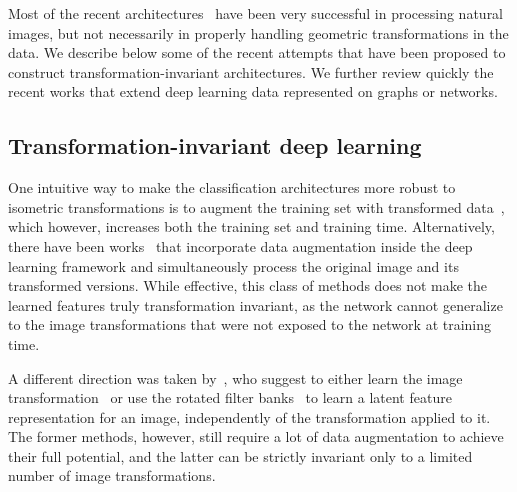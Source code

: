 \documentclass[10pt,journal,compsoc]{IEEEtran}
\newcommand{\renata}[1]{\textcolor{black}{#1}}
\begin{document}
	Most of the recent architectures~\cite{bb:lecun98gradient, bb:krizhevsky2012imagenetNIPS2012} have been very successful in processing natural images, but not necessarily in properly handling geometric transformations in the data. We describe below some of the recent attempts that have been proposed to construct transformation-invariant architectures. We further review quickly the recent works that extend deep learning data represented on graphs or networks. 
	
	
	\subsection{Transformation-invariant deep learning}
	
	One intuitive way to make the classification architectures more robust to isometric transformations is to augment the training set with transformed data~\cite{bb:van2012art}, which however, increases both the training set and training time. Alternatively, there have been works~\cite{bb:fasel2006rotation, bb:Coors2018VISAPP, bb:dima} that incorporate data augmentation inside the deep learning framework and simultaneously process the original image and its transformed versions. While effective, this class of methods does not make the learned features truly transformation invariant, as the network cannot generalize to the image transformations that were not exposed to the network at training time.
	
	A different direction was taken by~\cite{bb:STN, bb:dai2018, bb:marcos2016learning}, who suggest to either learn the image transformation~\cite{bb:STN, bb:dai2018} or use the rotated filter banks~\cite{bb:marcos2016learning} to learn a latent feature representation for an image, independently of the transformation applied to it. The former methods, however, still require a lot of data augmentation to achieve their full potential, and the latter can be strictly invariant only to a limited number of image transformations.
	
	
\end{document}
